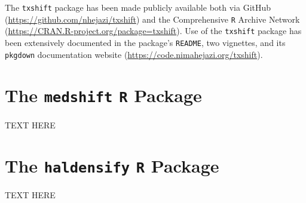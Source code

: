 The \texttt{txshift} package has been made publicly available both via
GitHub (\url{https://github.com/nhejazi/txshift}) and the Comprehensive
\texttt{R} Archive Network (\url{https://CRAN.R-project.org/package=txshift}).
Use of the \texttt{txshift} package has been extensively documented in the
package's \texttt{README}, two vignettes, and its \texttt{pkgdown} documentation
website (\url{https://code.nimahejazi.org/txshift}).

\section{The \texttt{medshift} \texttt{R} Package}

TEXT HERE

\section{The \texttt{haldensify} \texttt{R} Package}

TEXT HERE
